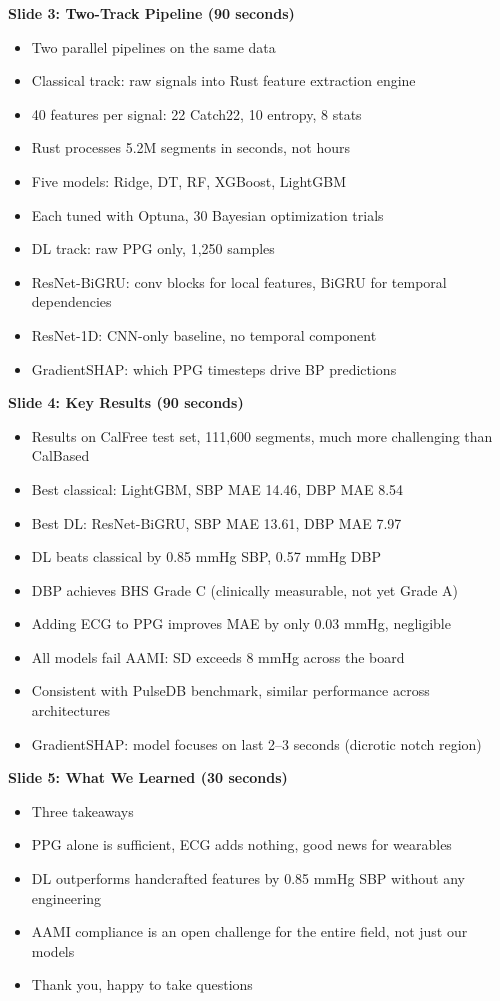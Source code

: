 \documentclass[11pt]{article}
\begin{document}
\textbf{Slide 3: Two-Track Pipeline (90 seconds)}
\begin{itemize}
  \item [VIGNAN] Two parallel pipelines on the same data
  \item [VIGNAN] Classical track: raw signals into Rust feature extraction engine
  \item [VIGNAN] 40 features per signal: 22 Catch22, 10 entropy, 8 stats
  \item [VIGNAN] Rust processes 5.2M segments in seconds, not hours
  \item [VIGNAN] Five models: Ridge, DT, RF, XGBoost, LightGBM
  \item [VIGNAN] Each tuned with Optuna, 30 Bayesian optimization trials
  \item [VIGNAN] DL track: raw PPG only, 1,250 samples
  \item [VIGNAN] ResNet-BiGRU: conv blocks for local features, BiGRU for temporal dependencies
  \item [VIGNAN] ResNet-1D: CNN-only baseline, no temporal component
  \item [VIGNAN] GradientSHAP: which PPG timesteps drive BP predictions
\end{itemize}

\textbf{Slide 4: Key Results (90 seconds)}
\begin{itemize}
  \item [VIGNAN] Results on CalFree test set, 111,600 segments, much more challenging than CalBased
  \item [VIGNAN] Best classical: LightGBM, SBP MAE 14.46, DBP MAE 8.54
  \item [VIGNAN] Best DL: ResNet-BiGRU, SBP MAE 13.61, DBP MAE 7.97
  \item [VIGNAN] DL beats classical by 0.85 mmHg SBP, 0.57 mmHg DBP
  \item [VIGNAN] DBP achieves BHS Grade C (clinically measurable, not yet Grade A)
  \item [VIGNAN] Adding ECG to PPG improves MAE by only 0.03 mmHg, negligible
  \item [VIGNAN] All models fail AAMI: SD exceeds 8 mmHg across the board
  \item [VIGNAN] Consistent with PulseDB benchmark, similar performance across architectures
  \item [VIGNAN] GradientSHAP: model focuses on last 2--3 seconds (dicrotic notch region)
\end{itemize}

\textbf{Slide 5: What We Learned (30 seconds)}
\begin{itemize}
  \item [ARIV] Three takeaways
  \item [ARIV] PPG alone is sufficient, ECG adds nothing, good news for wearables
  \item [ARIV] DL outperforms handcrafted features by 0.85 mmHg SBP without any engineering
  \item [ARIV] AAMI compliance is an open challenge for the entire field, not just our models
  \item [ARIV] Thank you, happy to take questions
\end{itemize}
\end{document}
